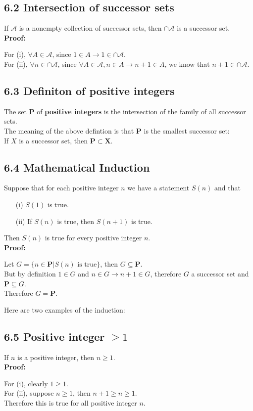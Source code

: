 \documentclass{article}
\begin{document}
\subsection*{6.2 Intersection of successor sets}
If $\mathscr{A}$ is a nonempty collection of successor sets, then $\cap \mathscr{A}$ is a successor set.\\
\textbf{Proof:}
\begin{addmargin}[1em]{0em}
    For (i), $\forall A \in \mathscr{A}$, since $1 \in A \rightarrow 1 \in \cap \mathscr{A}$.\\
    For (ii), $\forall n \in \cap\mathscr{A}$, since $\forall A \in \mathscr{A}, n \in A \rightarrow n+1 \in A$, we know that $n+1 \in \cap \mathscr{A}$.
\end{addmargin}
\subsection*{6.3 Definiton of positive integers}
The set $\mathbf{P}$ of \textbf{positive integers} is the intersection of the family of all successor sets.\\
The meaning of the above defintion is that $\mathbf{P}$ is the smallest successor set:\\
If $X$ is a successor set, then $\mathbf{P} \subset \mathbf{X}$.
\subsection*{6.4 Mathematical Induction}
Suppose that for each positive integer $n$ we have a statement $S(n)$ and that
\begin{itemize}
    \item[(i)] $S(1)$ is true.
    \item[(ii)] If $S(n)$ is true, then $S(n+1)$ is true.
\end{itemize}
Then $S(n)$ is true for every positive integer $n$.\\
\textbf{Proof:}
\begin{addmargin}[1em]{0em}
    Let $G = \{n \in \mathbf{P} | S(n) \textrm{ is true}\}$, then $G \subseteq \mathbf{P}$.\\
    But by definition $1 \in G$ and $n \in G \rightarrow n+1 \in G$, therefore $G$ a successor set and $\mathbf{P} \subseteq G$.\\
    Therefore $G = \mathbf{P}$.
\end{addmargin}
Here are two examples of the induction:
\subsection*{6.5 Positive integer $\geq 1$}
If $n$ is a positive integer, then $n \geq 1$.\\
\textbf{Proof:}
\begin{addmargin}[1em]{0em}
    For (i), clearly $1 \geq 1$.\\
    For (ii), suppose $n \geq 1$, then $n+1 \geq n \geq 1$.\\
    Therefore this is true for all positive integer $n$.
\end{addmargin}
\end{document}
